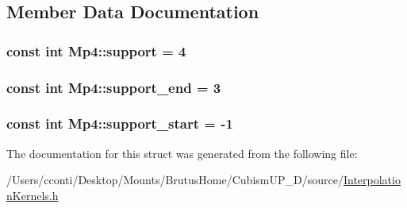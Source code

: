 \subsection{Member Data Documentation}
\hypertarget{struct_mp4_a9601f80a27b6863d3923fc9d2f45fd20}{}
\subsubsection[{support}]{\setlength{\rightskip}{0pt plus 5cm}const int Mp4\+::support = 4\hspace{0.3cm}{\ttfamily [static]}}\label{struct_mp4_a9601f80a27b6863d3923fc9d2f45fd20}
\hypertarget{struct_mp4_a90b6d0fb8de4d7850d5c95272c74878a}{}
\subsubsection[{support\+\_\+end}]{\setlength{\rightskip}{0pt plus 5cm}const int Mp4\+::support\+\_\+end = 3\hspace{0.3cm}{\ttfamily [static]}}\label{struct_mp4_a90b6d0fb8de4d7850d5c95272c74878a}
\hypertarget{struct_mp4_ab2bf493e922fb8082f05ca118cd472b3}{}
\subsubsection[{support\+\_\+start}]{\setlength{\rightskip}{0pt plus 5cm}const int Mp4\+::support\+\_\+start = -\/1\hspace{0.3cm}{\ttfamily [static]}}\label{struct_mp4_ab2bf493e922fb8082f05ca118cd472b3}


The documentation for this struct was generated from the following file\+:\begin{DoxyCompactItemize}
\item 
/\+Users/cconti/\+Desktop/\+Mounts/\+Brutus\+Home/\+Cubism\+U\+P\+\_\+D/source/\hyperlink{_interpolation_kernels_8h}{Interpolation\+Kernels.\+h}\end{DoxyCompactItemize}
